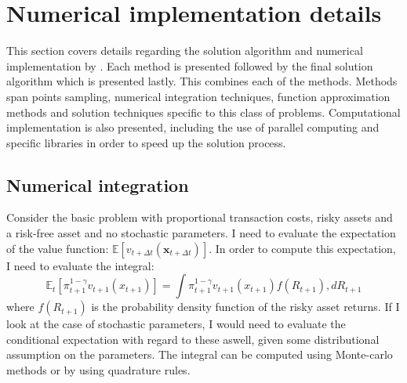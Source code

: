 \documentclass[11pt]{article}
\begin{document}
\fi

\section{Numerical implementation details} \label{Section: Implmentation-details}
This section covers details regarding the solution algorithm and numerical implementation by \autocite{Scheidegger2023}.
Each method is presented followed by the final solution algorithm which is presented lastly.
This combines each of the methods. Methods span points sampling, numerical integration techniques, function approximation methods
and solution techniques specific to this class of problems. Computational implementation is also presented, including the use of parallel computing and specific libraries
in order to speed up the solution process.
\subsection{Numerical integration} \label{Subsection: NumericalIntegration}
Consider the basic problem with proportional transaction costs, risky assets and a risk-free asset and no stochastic parameters.
I need to evaluate the expectation of the value function:
$\mathbb{E} \left[ v_{t+\Delta t} (\mathbf{x}_{t+\Delta t }  ) \right]$.
In order to compute this expectation, I need to evaluate the integral:
\begin{equation}
  \mathbb{E}_{t} \left[ \pi_{t+1}^{1-\gamma} v_{t+1} (x_{t+1}) \right] = \int \pi_{t+1}^{1-\gamma} v_{t+1} (x_{t+1}) f(R_{t+1}), d R_{t+1}
\end{equation}
where $f(R_{t+1})$ is the probability density function of the risky asset returns. If I look at the case of stochastic parameters, I
would need to evaluate the conditional expectation with regard to these aswell, given some distributional assumption on the parameters.
The integral can be computed using Monte-carlo methods
or by using quadrature rules.
\end{document}
